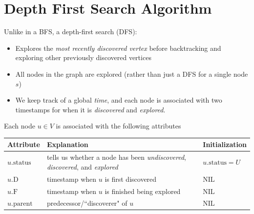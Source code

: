 \documentclass[11  pt]{exam}
\begin{document}
	
	
	

	
	\section{Depth First Search Algorithm}
	Unlike in a BFS, a depth-first search (DFS):
	\begin{itemize}
		\item Explores the \emph{most recently discovered vertex} before backtracking and exploring other previously discovered vertices
		\item All nodes in the graph are explored (rather than just a DFS for a single node $s$)
		\item We keep track of a global \emph{time}, and each node is associated with two timestamps for when it is \emph{discovered} and \emph{explored}.
	\end{itemize}
	
	Each node $u \in V$ is associated with the following attributes
	
	\begin{tabular}{| l | p{8cm} | p{6cm} |}
		\hline
		Attribute & Explanation &Initialization \\
		\hline
		$u.\text{status}$ & tells us whether a node has been \emph{undiscovered}, \emph{discovered}, and \emph{explored} &  $u.\text{status} = U$\\
		\hline
		$u.\text{D}$ & timestamp when $u$ is first discovered & NIL  \\
		\hline
		$u.\text{F}$ & timestamp when $u$ is finished being explored   & NIL  \\
		\hline
		$u.\text{parent}$ & predecessor/``discoverer" of $u$ & NIL \\
		\hline
	\end{tabular}
	
\end{document}
